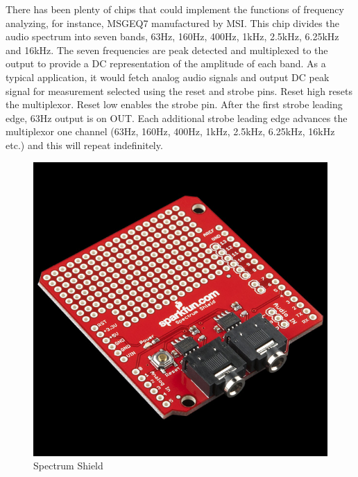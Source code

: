 \documentclass[12pt,a4paper,journal]{IEEEtran}
\begin{document}
There has been plenty of chips that could implement the functions of frequency analyzing, for instance, MSGEQ7 manufactured by MSI. This chip divides the audio spectrum into seven bands, 63Hz, 160Hz, 400Hz, 1kHz, 2.5kHz, 6.25kHz and 16kHz. The seven frequencies are peak detected and multiplexed to the output to provide a DC representation of the amplitude of each band. As a typical application, it would fetch analog audio signals and output DC peak signal for measurement selected using the reset and strobe pins. Reset high resets the multiplexor. Reset low enables the strobe pin. After the first strobe leading edge, 63Hz output is on OUT. Each additional strobe leading edge advances the multiplexor one channel (63Hz, 160Hz, 400Hz, 1kHz, 2.5kHz, 6.25kHz, 16kHz etc.) and this will repeat indefinitely.
\begin{figure}[ht]
  \centering
  \includegraphics[width=0.7\linewidth]{spectrumshield.jpg}
  \caption{Spectrum Shield}
  \label{fig:tas4}
\end{figure}
\end{document}
